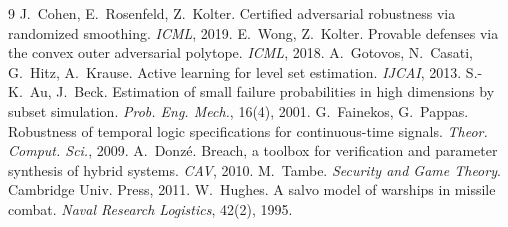\documentclass[11pt]{article}
\begin{document}
\begin{thebibliography}{9}
\small
{} J.~Cohen, E.~Rosenfeld, Z.~Kolter. Certified adversarial robustness via
randomized smoothing. \emph{ICML}, 2019.
 E.~Wong, Z.~Kolter. Provable defenses via the convex outer adversarial
polytope. \emph{ICML}, 2018.
 A.~Gotovos, N.~Casati, G.~Hitz, A.~Krause. Active learning for level set
estimation. \emph{IJCAI}, 2013.
 S.-K.~Au, J.~Beck. Estimation of small failure probabilities in high
dimensions by subset simulation. \emph{Prob. Eng. Mech.}, 16(4), 2001.
 G.~Fainekos, G.~Pappas. Robustness of temporal logic specifications for
continuous-time signals. \emph{Theor. Comput. Sci.}, 2009.
 A.~Donz\'e. Breach, a toolbox for verification and parameter synthesis of
hybrid systems. \emph{CAV}, 2010.
 M.~Tambe. \emph{Security and Game Theory}. Cambridge Univ. Press, 2011.
 W.~Hughes. A salvo model of warships in missile combat. \emph{Naval
Research Logistics}, 42(2), 1995.
\end{thebibliography}
\end{document}
